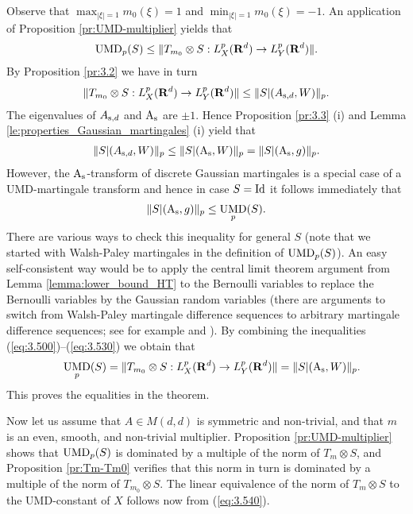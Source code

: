 \documentclass[11pt,a4paper,twoside,draft]{amsart}
\theoremstyle{definition}
\newcommand{\beqla}[1] {\begin {eqnarray}\label{#1}}
\def\eeq {\end {eqnarray}}
\newcommand{\real}{{\bf R}}
\DeclareMathOperator{\umd}{{\rm UMD}}
\DeclareMathOperator{\bsym}{{A_{\rm s}}}
\newcommand{\bsymm}[1]{{A_{{\rm s},#1}}}
\newcommand{\ito}[3]{\| #1 |(#2 ,W)\|_{#3}}
\newcommand{\dito}[3]{\| #1 |(#2 ,g)\|_{#3}}
\newcommand{\refeq}[1]{(\ref{#1})}
\begin{document}
Observe  that $\max_{|\xi | =1} m_0(\xi )=1$ and $\min_{|\xi | =1} m_0(\xi )=-1$.
An application of Proposition \ref{pr:UMD-multiplier} yields that
\beqla{eq:3.500}
{\umd}_p(S) 
   \leq  \| T_{m_0}\otimes S  
   : L^p_X(\real^d)  \to L^p_Y(\real^d)\|. 
\eeq 
By Proposition \ref{pr:3.2} we have in turn
\beqla{eq:3.510}
 \| T_{m_0}\otimes S  
   : L^p_X(\real^d)  \to L^p_Y(\real^d)\|\leq \ito{S}{\bsymm{d}}{p}. 
\eeq 
The eigenvalues of $\bsymm{d}$ and $\bsym$ are $\pm 1$. Hence Proposition
\ref{pr:3.3} (i) and Lemma \ref{le:properties_Gaussian_martingales} (i) yield that
\beqla{eq:3.520}
\ito{S}{\bsymm{d}}{p}\leq \ito{S}{\bsym}{p} =\dito{S}{\bsym}{p}.
\eeq
However, the $\bsym$-transform of discrete Gaussian martingales
is a special case of a UMD-martingale transform and
hence in case $S={\rm Id}$ it follows immediately that
\beqla{eq:3.530}
\dito{S}{\bsym}{p}\leq \umd_p (S).
\eeq
There are various ways to check this inequality for general $S$ (note that we started with
Walsh-Paley martingales in the definition of $\umd_p (S)$). 
An easy self-consistent way would be to apply
the central limit theorem argument from Lemma \ref{lemma:lower_bound_HT} to the 
Bernoulli variables to replace the Bernoulli variables by the Gaussian random variables
(there are arguments to switch from Walsh-Paley martingale difference sequences to 
arbitrary martingale difference sequences; see for example \cite[p. 12]{Burk4}
and \cite{Maurey}).
By combining the inequalities \refeq{eq:3.500}--\refeq{eq:3.530}
we obtain  that 
\beqla{eq:3.540}
&&   \umd_p (S) 
   = \| T_{m_0}\otimes S : L^p_X(\real^d)  \to L^p_Y(\real^d)\|
   = \ito{S}{\bsym}{p}.
\eeq
This proves the equalities in the theorem.

Now let us assume that $A\in M(d,d)$ is symmetric and non-trivial, 
and that $m$ is an even, smooth, and non-trivial multiplier. 
Proposition \ref{pr:UMD-multiplier} shows that $\umd_p(S)$ is
dominated by a multiple of the norm of $T_m\otimes S$, and 
Proposition \ref{pr:Tm-Tm0} verifies that this norm in turn is dominated by 
a multiple of the norm of $T_{m_0}\otimes S$. The linear 
equivalence of the norm of $T_m\otimes S$
to the UMD-constant of $X$ follows now from \refeq{eq:3.540}.  
 
\end{document}
